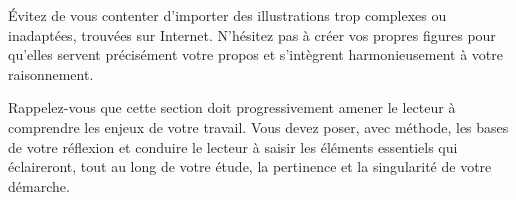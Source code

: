 Évitez de vous contenter d'importer des illustrations trop complexes ou inadaptées, trouvées sur Internet. N'hésitez pas à créer vos propres figures pour qu'elles servent précisément votre propos et s'intègrent harmonieusement à votre raisonnement.

Rappelez-vous que cette section doit progressivement amener le lecteur à comprendre les enjeux de votre travail. Vous devez poser, avec méthode, les bases de votre réflexion et conduire le lecteur à saisir les éléments essentiels qui éclaireront, tout au long de votre étude, la pertinence et la singularité de votre démarche.